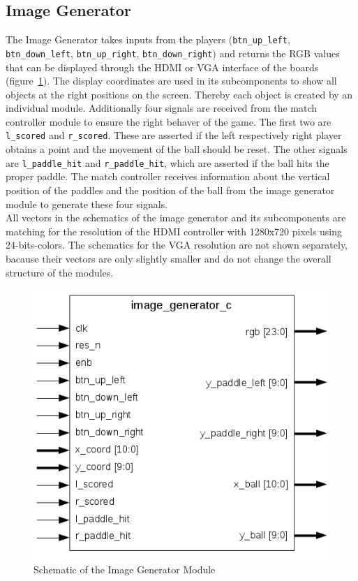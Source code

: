     \subsection{Image Generator}
        The Image Generator takes inputs from the players (\texttt{btn\_up\_left}, \texttt{btn\_down\_left}, \texttt{btn\_up\_right}, \texttt{btn\_down\_right}) and returns the RGB values that can be displayed through the HDMI or VGA interface of the boards (figure~\ref{img_gen_sch}). The display coordinates are used in its subcomponents to show all objects at the right positions on the screen. Thereby each object is created by an individual module. Additionally four signals are received from the match controller module to ensure the right behaver of the game. The first two are \texttt{l\_scored} and \texttt{r\_scored}. These are asserted if the left respectively right player obtains a point and the movement of the ball should be reset. The other signals are \texttt{l\_paddle\_hit} and \texttt{r\_paddle\_hit}, which are asserted if the ball hits the proper paddle. The match controller receives information about the vertical position of the paddles and the position of the ball from the image generator module to generate these four signals.\\
All vectors in the schematics of the image generator and its subcomponents are matching for the resolution of the HDMI controller with 1280x720 pixels using 24-bits-colors. The schematics for the VGA resolution are not shown separately, bacause their vectors are only slightly smaller and do not change the overall structure of the modules.
	    \begin{figure}[h]
		    \centering
		    \includegraphics[scale=0.7]{images/image_generator_schematic.png}
		    \caption{Schematic of the Image Generator Module}
		    \label{img_gen_sch}
	    \end{figure}
